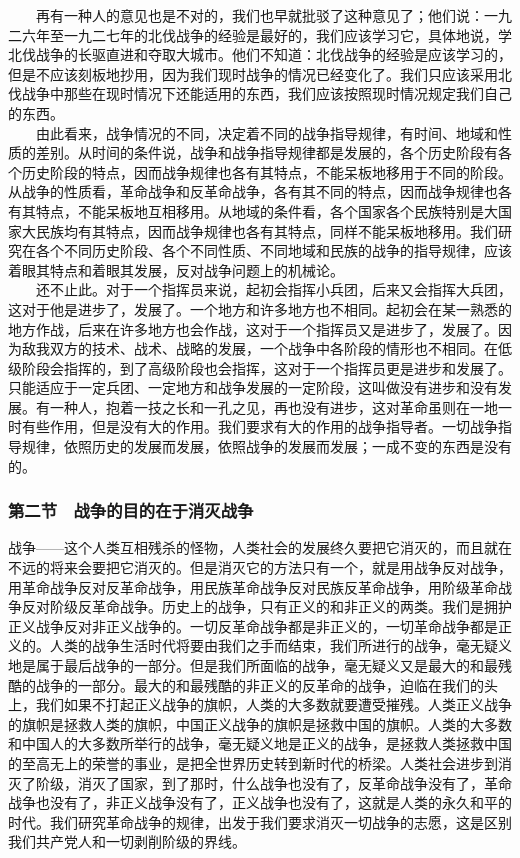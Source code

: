 \documentclass[cn,11pt,chinese]{elegantbook}
\def\myformat#1{\hfil\hfil #1}
\begin{document}
　　再有一种人的意见也是不对的，我们也早就批驳了这种意见了；他们说：一九二六年至一九二七年的北伐战争的经验是最好的，我们应该学习它，具体地说，学北伐战争的长驱直进和夺取大城市。他们不知道：北伐战争的经验是应该学习的，但是不应该刻板地抄用，因为我们现时战争的情况已经变化了。我们只应该采用北伐战争中那些在现时情况下还能适用的东西，我们应该按照现时情况规定我们自己的东西。\\
　　由此看来，战争情况的不同，决定着不同的战争指导规律，有时间、地域和性质的差别。从时间的条件说，战争和战争指导规律都是发展的，各个历史阶段有各个历史阶段的特点，因而战争规律也各有其特点，不能呆板地移用于不同的阶段。从战争的性质看，革命战争和反革命战争，各有其不同的特点，因而战争规律也各有其特点，不能呆板地互相移用。从地域的条件看，各个国家各个民族特别是大国家大民族均有其特点，因而战争规律也各有其特点，同样不能呆板地移用。我们研究在各个不同历史阶段、各个不同性质、不同地域和民族的战争的指导规律，应该着眼其特点和着眼其发展，反对战争问题上的机械论。\\
　　还不止此。对于一个指挥员来说，起初会指挥小兵团，后来又会指挥大兵团，这对于他是进步了，发展了。一个地方和许多地方也不相同。起初会在某一熟悉的地方作战，后来在许多地方也会作战，这对于一个指挥员又是进步了，发展了。因为敌我双方的技术、战术、战略的发展，一个战争中各阶段的情形也不相同。在低级阶段会指挥的，到了高级阶段也会指挥，这对于一个指挥员更是进步和发展了。只能适应于一定兵团、一定地方和战争发展的一定阶段，这叫做没有进步和没有发展。有一种人，抱着一技之长和一孔之见，再也没有进步，这对革命虽则在一地一时有些作用，但是没有大的作用。我们要求有大的作用的战争指导者。一切战争指导规律，依照历史的发展而发展，依照战争的发展而发展；一成不变的东西是没有的。\\
\subsubsection*{\myformat{第二节　战争的目的在于消灭战争}}
战争——这个人类互相残杀的怪物，人类社会的发展终久要把它消灭的，而且就在不远的将来会要把它消灭的。但是消灭它的方法只有一个，就是用战争反对战争，用革命战争反对反革命战争，用民族革命战争反对民族反革命战争，用阶级革命战争反对阶级反革命战争。历史上的战争，只有正义的和非正义的两类。我们是拥护正义战争反对非正义战争的。一切反革命战争都是非正义的，一切革命战争都是正义的。人类的战争生活时代将要由我们之手而结束，我们所进行的战争，毫无疑义地是属于最后战争的一部分。但是我们所面临的战争，毫无疑义又是最大的和最残酷的战争的一部分。最大的和最残酷的非正义的反革命的战争，迫临在我们的头上，我们如果不打起正义战争的旗帜，人类的大多数就要遭受摧残。人类正义战争的旗帜是拯救人类的旗帜，中国正义战争的旗帜是拯救中国的旗帜。人类的大多数和中国人的大多数所举行的战争，毫无疑义地是正义的战争，是拯救人类拯救中国的至高无上的荣誉的事业，是把全世界历史转到新时代的桥梁。人类社会进步到消灭了阶级，消灭了国家，到了那时，什么战争也没有了，反革命战争没有了，革命战争也没有了，非正义战争没有了，正义战争也没有了，这就是人类的永久和平的时代。我们研究革命战争的规律，出发于我们要求消灭一切战争的志愿，这是区别我们共产党人和一切剥削阶级的界线。\\
\end{document}
